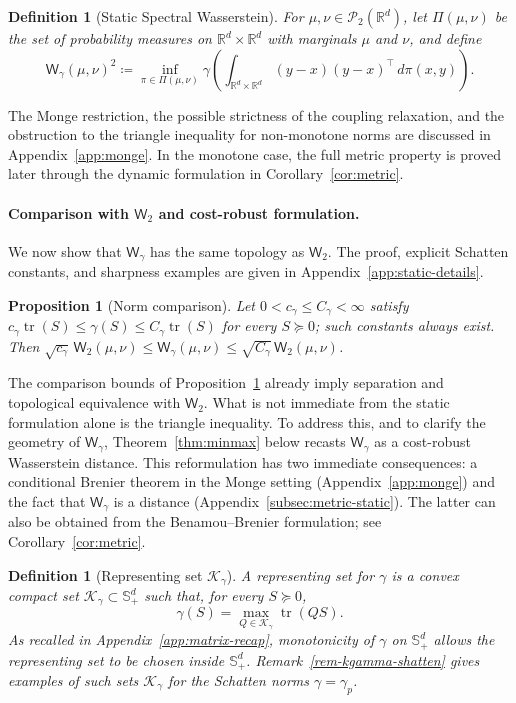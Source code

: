 \documentclass{article}
\newtheorem{proposition}[theorem]{Proposition}
\newtheorem{definition}[theorem]{Definition}
\newcommand{\R}{\mathbb{R}}
\newcommand{\cP}{\mathcal{P}}
\newcommand{\Wtwo}{\mathsf{W}_2}
\newcommand{\Wg}{\mathsf{W}_{\gamma}}
\newcommand{\tr}{\operatorname{tr}}
\newcommand{\cK}{\mathcal K_\gamma}
\begin{document}
\begin{definition}[Static Spectral Wasserstein]
\label{def:static}
For $\mu,\nu\in\cP_2(\R^d)$, let $\Pi(\mu,\nu)$ be the set of probability measures on $\R^d\times\R^d$ with marginals $\mu$ and $\nu$, and define
$$
\Wg(\mu,\nu)^2
\coloneqq 
\inf_{\pi\in\Pi(\mu,\nu)}
\gamma\!\left(
\int_{\R^d\times\R^d}(y-x)(y-x)^\top\,d\pi(x,y)
\right).
$$
\end{definition}

The Monge restriction, the possible strictness of the coupling relaxation, and the obstruction to the triangle inequality for non-monotone norms are discussed in Appendix~\ref{app:monge}. In the monotone case, the full metric property is proved later through the dynamic formulation in Corollary~\ref{cor:metric}.

\paragraph{Comparison with $\Wtwo$ and cost-robust formulation.}

We now show that $\Wg$ has the same topology as $\Wtwo$. The proof, explicit
Schatten constants, and sharpness examples are given in
Appendix~\ref{app:static-details}.

\begin{proposition}[Norm comparison]
\label{prop:bounds}
Let $0<c_\gamma\le C_\gamma<\infty$ satisfy
$c_\gamma\tr(S)\le \gamma(S)\le C_\gamma\tr(S)$ for every $S\succeq0$;
such constants always exist. Then
$\sqrt{c_\gamma}\,\Wtwo(\mu,\nu)\le \Wg(\mu,\nu)
\le \sqrt{C_\gamma}\,\Wtwo(\mu,\nu)$.
\end{proposition}


The comparison bounds of Proposition~\ref{prop:bounds} already imply
separation and topological equivalence with $\Wtwo$. What is not immediate from
the static formulation alone is the triangle inequality. To address this, and to
clarify the geometry of $\Wg$, Theorem~\ref{thm:minmax} below recasts $\Wg$ as a
cost-robust Wasserstein distance. This reformulation has two immediate
consequences: a conditional Brenier theorem in the Monge setting
(Appendix~\ref{app:monge}) and the fact that $\Wg$ is a distance
(Appendix~\ref{subsec:metric-static}). The latter can also be obtained from the
Benamou--Brenier formulation; see Corollary~\ref{cor:metric}.


\begin{definition}[Representing set $\cK$]
\label{def:representing-set}
A representing set for $\gamma$ is a convex compact set
$\cK\subset \mathbb S_+^d$ such that, for every $S\succeq0$,
\[
    \gamma(S)=\max_{Q\in\cK}\tr(QS).
\]
%
As recalled in Appendix~\ref{app:matrix-recap}, monotonicity of $\gamma$ on
$\mathbb S_+^d$ allows the representing set to be chosen inside
$\mathbb S_+^d$.
%
Remark~\ref{rem-kgamma-shatten} gives examples of such sets
$\cK$ for the Schatten norms $\gamma=\gamma_p$.
\end{definition}
\end{document}
